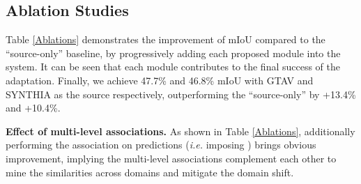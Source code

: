 \subsection{Ablation Studies}
\renewcommand\arraystretch{1.2}
\setlength{\tabcolsep}{6pt}
\begin{table}[ht]
\caption{\label{Ablations} Ablation studies based on task GTAV  Cityscapes and SYNTHIA  Cityscapes.
The ``source-only'' means the model trained using source data only,
while ``source+target'' represents the adaptation with 
labeled source data and unlabeled target data.
The , , , and  in Eq. (\ref{full-obj}) are progressively added to show their effectiveness.
The mIoUs on the Cityscapes test set with respect to 19 and 16 classes are reported for the task GTAV  Cityscapes and SYNTHIA  Cityscapes, respectively.
Our full method is denoted as ``PLCA''.
The ``Sim-PLCA'' means the PLCA is trained 
by directly encouraging the pixel-wise similarities,
while the ``PLCA w/o. SAGG'' denotes PLCA is trained without the 
spatial aggregation module discussed in Section \ref{section-sa}.
}
\vspace{-4mm}
\begin{center}
\end{center}
\end{table}


Table \ref{Ablations} demonstrates the improvement of mIoU compared to the ``source-only'' baseline,
by progressively adding each proposed module into the system.
It can be seen that each module contributes to the final success of the adaptation.
Finally, we achieve 47.7\% and 46.8\% mIoU with GTAV and SYNTHIA as the source respectively,
outperforming the ``source-only'' by +13.4\%  and +10.4\%.

\textbf{Effect of multi-level associations.}
As shown in Table \ref{Ablations}, 
additionally performing the association on predictions (\emph{i.e.} imposing ) brings obvious
improvement, implying the multi-level associations complement each other
to mine the similarities across domains and mitigate the domain shift.

